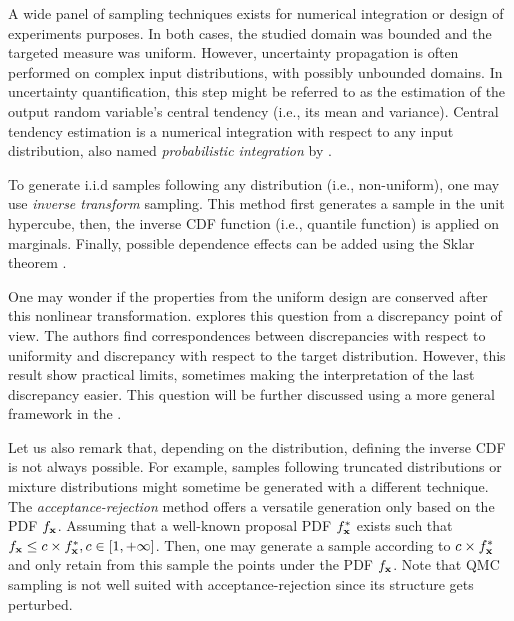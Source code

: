 A wide panel of sampling techniques exists for numerical integration or design of experiments purposes. 
In both cases, the studied domain was bounded and the targeted measure was uniform. 
However, uncertainty propagation is often performed on complex input distributions, with possibly unbounded domains. 
In uncertainty quantification, this step might be referred to as the estimation of the output random variable's central tendency (i.e., its mean and variance).
Central tendency estimation is a numerical integration with respect to any input distribution, also named \textit{probabilistic integration} by \citet{briol_oates_2019}.  

To generate i.i.d samples following any distribution (i.e., non-uniform), one may use \textit{inverse transform} sampling.
This method first generates a sample in the unit hypercube, then, the inverse CDF function (i.e., quantile function) is applied on marginals. 
Finally, possible dependence effects can be added using the Sklar theorem .

One may wonder if the properties from the uniform design are conserved after this nonlinear transformation. 
\citet{hickernell_2020} explores this question from a discrepancy point of view. 
The authors find correspondences between discrepancies with respect to uniformity and discrepancy with respect to the target distribution. 
However, this result show practical limits, sometimes making the interpretation of the last discrepancy easier. 
This question will be further discussed using a more general framework in the .

Let us also remark that, depending on the distribution, defining the inverse CDF is not always possible.
For example, samples following truncated distributions or mixture distributions might sometime be generated with a different technique. 
The \textit{acceptance-rejection} method offers a versatile generation only based on the PDF $f_{{\bf x}}$.
Assuming that a well-known proposal PDF $f^*_{{\bf x}}$ exists such that $f_{{\bf x}} \leq c \times f^*_{{\bf x}}, c \in [1, +\infty]$. 
Then, one may generate a sample according to $c \times f^*_{{\bf x}}$ and only retain from this sample the points under the PDF $f_{{\bf x}}$.
Note that QMC sampling is not well suited with acceptance-rejection since its structure gets perturbed. 

